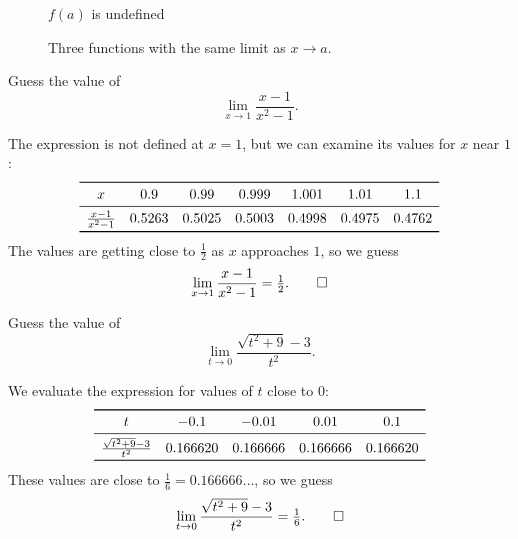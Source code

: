\begin{figure}[H]
\begin{minipage}[t]{0.32\textwidth}
\vspace{0.3em}
\(f(a)\) is undefined
\end{minipage}

\caption{Three functions with the same limit as \(x \to a\).}
\label{fig:limit-same-near-a}
\end{figure}

\begin{workedexample}
\begin{example}
Guess the value of
\[
\lim_{x \to 1} \frac{x - 1}{x^{2} - 1}.
\]
\end{example}

\begin{solution}
The expression is not defined at \(x = 1\), but we can examine its values for \(x\) near \(1\):
\[
\begin{array}{c cccccc}
\toprule
x & 0.9 & 0.99 & 0.999 & 1.001 & 1.01 & 1.1 \\
\midrule
\tfrac{x - 1}{x^{2} - 1} & 0.5263 & 0.5025 & 0.5003 & 0.4998 & 0.4975 & 0.4762 \\
\bottomrule
\end{array}
\]
The values are getting close to \(\tfrac{1}{2}\) as \(x\) approaches \(1\), so we guess
\[
\lim_{x \to 1} \frac{x - 1}{x^{2} - 1} = \tfrac{1}{2}. \qedhere
\]
\end{solution}
\end{workedexample}

\begin{workedexample}
\begin{example}
Guess the value of
\[
\lim_{t \to 0} \frac{\sqrt{t^{2} + 9} - 3}{t^{2}}.
\]
\end{example}

\begin{solution}
We evaluate the expression for values of \(t\) close to \(0\):
\[
\begin{array}{c cccc}
\toprule
t & -0.1 & -0.01 & 0.01 & 0.1 \\
\midrule
\tfrac{\sqrt{t^{2} + 9} - 3}{t^{2}} & 0.166620 & 0.166666 & 0.166666 & 0.166620 \\
\bottomrule
\end{array}
\]
These values are close to \(\tfrac{1}{6} = 0.166666\dots\), so we guess
\[
\lim_{t \to 0} \frac{\sqrt{t^{2} + 9} - 3}{t^{2}} = \tfrac{1}{6}. \qedhere
\]
\end{solution}
\end{workedexample}

